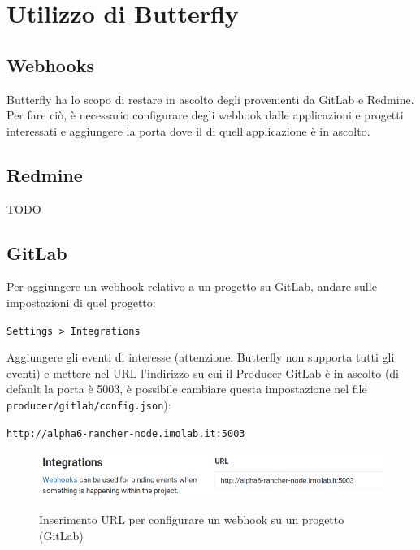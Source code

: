 \section{Utilizzo di Butterfly}\label{utilizzo}


\subsection{Webhooks} %

Butterfly ha lo scopo di restare in ascolto degli  provenienti da GitLab e Redmine.
Per fare ciò, è necessario configurare degli webhook dalle applicazioni e progetti interessati e aggiungere
la porta dove il  di quell'applicazione è in ascolto.

\subsection{Redmine}
TODO

\subsection{GitLab}

Per aggiungere un webhook relativo a un progetto su GitLab, andare sulle impostazioni di quel progetto:

\begin{center}
    \texttt{Settings > Integrations}
\end{center}

Aggiungere gli eventi di interesse (attenzione: Butterfly non supporta tutti gli eventi) e mettere nel URL
l'indirizzo su cui il Producer GitLab è in ascolto (di default la porta è 5003, è possibile cambiare questa impostazione
nel file \texttt{producer/gitlab/config.json}): %

\begin{center}
    \texttt{http://alpha6-rancher-node.imolab.it:5003}
\end{center}

\begin{figure}[H]
    \centering
    \includegraphics[width=\textwidth]{img/webhook-gitlab.png}\\
    \caption[Webhook, GitLab]{Inserimento URL per configurare un webhook su un progetto (GitLab)}
\end{figure}


